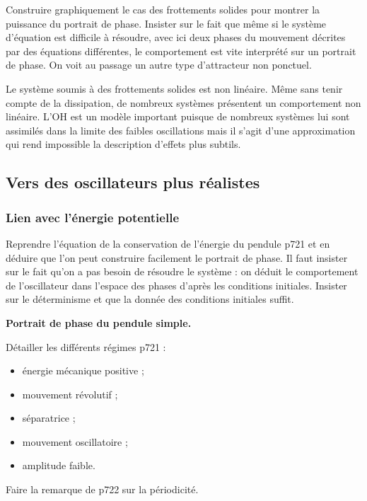 Construire graphiquement le cas des frottements solides pour montrer la puissance du portrait de phase.
Insister sur le fait que même si le système d'équation est difficile à résoudre, avec ici deux phases du mouvement décrites par des équations différentes, le comportement est vite interprété sur un portrait de phase.
On voit au passage un autre type d'attracteur non ponctuel.

\begin{transition}
Le système soumis à des frottements solides est non linéaire.
Même sans tenir compte de la dissipation, de nombreux systèmes présentent un comportement non linéaire.
L'OH est un modèle important puisque de nombreux systèmes lui sont assimilés dans la limite des faibles oscillations mais il s'agit d'une approximation qui rend impossible la description d'effets plus subtils.
\end{transition}

\subsection{Vers des oscillateurs plus réalistes}

\subsubsection{Lien avec l'énergie potentielle}

Reprendre l'équation de la conservation de l'énergie du pendule \cite{Gie1992} p721 et en déduire que l'on peut construire facilement le portrait de phase.
Il faut insister sur le fait qu'on a pas besoin de résoudre le système : on déduit le comportement de l'oscillateur dans l'espace des phases d'après les conditions initiales. 
Insister sur le déterminisme et que la donnée des conditions initiales suffit.

\begin{slide}
\textbf{Portrait de phase du pendule simple.}
\end{slide}

Détailler les différents régimes \cite{Gie1992} p721 :
\begin{itemize}
\item énergie mécanique positive ;
\item mouvement révolutif ;
\item séparatrice ;
\item mouvement oscillatoire ;
\item amplitude faible.
\end{itemize}
Faire la remarque de \cite{Gie1992} p722 sur la périodicité.

